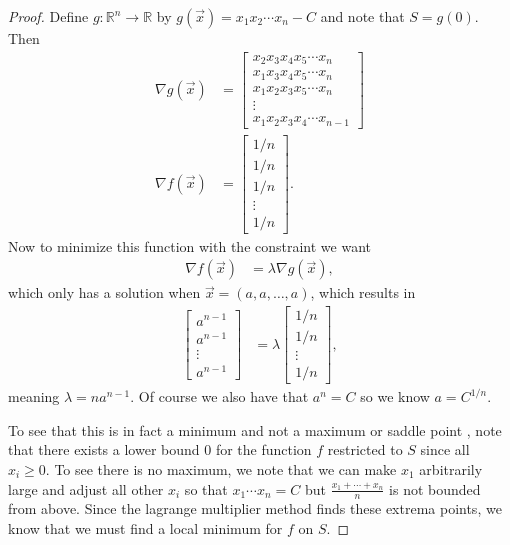 \documentclass[leqno]{article}
\theoremstyle{nonumberplain}
\newtheorem{proof}{Proof}
\newcommand{\R}{\mathbb{R}}
\begin{document}
\begin{proof}
Define $g\colon \R^n\to \R$ by $g(\vec{x})=x_1 x_2 \cdots x_n - C$ and note that $S=g(0)$.  Then
\begin{align*}
\nabla g(\vec{x})&= \begin{bmatrix}
x_2x_3x_4 x_5\cdots x_n\\
x_1 x_3 x_4 x_5\cdots x_n \\
x_1 x_2 x_3 x_5 \cdots x_n\\
\vdots\\
x_1 x_2 x_3 x_4 \cdots x_{n-1}
\end{bmatrix}\\
\nabla f(\vec{x})&= \begin{bmatrix}
1/n\\
1/n\\
1/n\\
\vdots\\
1/n
\end{bmatrix}.
\end{align*}
Now to minimize this function with the constraint we want 
\begin{align*}
\nabla f(\vec{x})&=\lambda \nabla g(\vec{x}),
\end{align*}
which only has a solution when $\vec{x}=(a,a,\dots,a)$, which results in 
\begin{align*}
\begin{bmatrix}
a^{n-1}\\
a^{n-1}\\
\vdots\\
a^{n-1}
\end{bmatrix}
&=
\lambda
\begin{bmatrix}
1/n\\
1/n\\
\vdots\\
1/n
\end{bmatrix},
\end{align*}
meaning $\lambda=na^{n-1}$. Of course we also have that $a^n =C$ so we know $a=C^{1/n}$. 

To see that this is in fact a minimum and not a maximum or saddle point , note that there exists a lower bound 0 for the function $f$ restricted to $S$ since all $x_i\geq 0$. To see there is no maximum, we note that we can make $x_1$ arbitrarily large and adjust all other $x_i$ so that $x_1 \cdots x_n = C$ but $\frac{x_1+\cdots + x_n}{n}$ is not bounded from above.  Since the lagrange multiplier method finds these extrema points, we know that we must find a local minimum for $f$ on $S$.



\end{proof}
\end{document}
